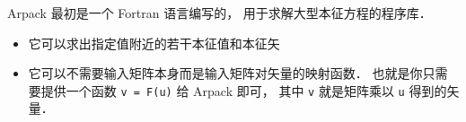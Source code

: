 
Arpack 最初是一个 Fortran 语言编写的， 用于求解大型本征方程的程序库．
\begin{itemize}
\item 它可以求出指定值附近的若干本征值和本征矢
\item 它可以不需要输入矩阵本身而是输入矩阵对矢量的映射函数． 也就是你只需要提供一个函数 \verb|v = F(u)| 给 Arpack 即可， 其中 \verb|v| 就是矩阵乘以 \verb|u| 得到的矢量．
\end{itemize}
